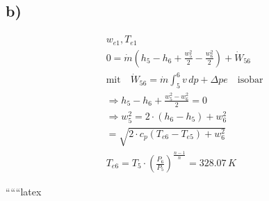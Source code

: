 

\subsection*{b)}

\begin{align*}
    & w_{e1}, T_{e1} \\
    & 0 = \dot{m} (h_5 - h_6 + \frac{w_5^2}{2} - \frac{w_6^2}{2}) + \dot{W}_{56} \\
    & \text{mit} \quad \dot{W}_{56} = \dot{m} \int_{5}^{6} v \, dp + \Delta pe \quad \text{isobar} \\
    & \Rightarrow h_5 - h_6 + \frac{w_5^2 - w_6^2}{2} = 0 \\
    & \Rightarrow w_5^2 = 2 \cdot (h_6 - h_5) + w_6^2 \\
    & = \sqrt{2 \cdot c_p (T_{e6} - T_{e5}) + w_6^2} \\
    & T_{e6} = T_5 \cdot \left( \frac{P_6}{P_5} \right)^{\frac{n-1}{n}} = 328.07 \, K
\end{align*}

``````latex